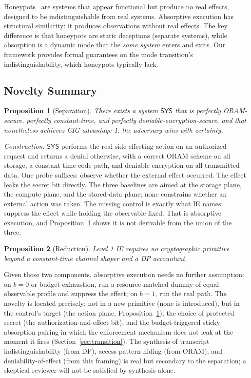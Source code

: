 \documentclass[11pt,a4paper]{article}
\newtheorem{proposition}{Proposition}[section]
\begin{document}
Honeypots~\cite{spitzner2003honeypots} are systems that appear functional but produce no real effects, designed to be indistinguishable from real systems. Absorptive execution has structural similarity: it produces observations without real effects. The key difference is that honeypots are static deceptions (separate systems), while absorption is a dynamic mode that the \textit{same system} enters and exits. Our framework provides formal guarantees on the mode transition's indistinguishability, which honeypots typically lack.

\subsection{Novelty Summary}\label{sec:novelty}

\begin{proposition}[Separation]\label{prop:separation}
There exists a system $\mathsf{SYS}$ that is perfectly ORAM-secure, perfectly constant-time, and perfectly deniable-encryption-secure, and that nonetheless achieves CIG-advantage 1: the adversary wins with certainty.
\end{proposition}

\textit{Construction.} $\mathsf{SYS}$ performs the real side-effecting action on an authorized request and returns a denial otherwise, with a correct ORAM scheme on all storage, a constant-time code path, and deniable encryption on all transmitted data. One probe suffices: observe whether the external effect occurred. The effect leaks the secret bit directly. The three baselines are aimed at the storage plane, the compute plane, and the stored-data plane; none constrains whether an external action was taken. The missing control is exactly what IE names: suppress the effect while holding the observable fixed. That is absorptive execution, and Proposition~\ref{prop:separation} shows it is not derivable from the union of the three.

\begin{proposition}[Reduction]\label{prop:reduction}
Level 1 IE requires no cryptographic primitive beyond a constant-time channel shaper and a DP accountant.
\end{proposition}

Given those two components, absorptive execution needs no further assumption: on $b = 0$ or budget exhaustion, run a resource-matched dummy of equal observable profile and suppress the effect; on $b = 1$, run the real path. The novelty is located precisely: not in a new primitive (none is introduced), but in the control's target (the action plane, Proposition~\ref{prop:separation}), the choice of protected secret (the authorization-and-effect bit), and the budget-triggered sticky absorption pairing in which the enforcement mechanism does not leak at the moment it fires (Section~\ref{sec:transition}). The synthesis of transcript indistinguishability (from DP), access pattern hiding (from ORAM), and deniability-of-effect (from this framing) is real but secondary to the separation; a skeptical reviewer will not be satisfied by synthesis alone.
\end{document}
